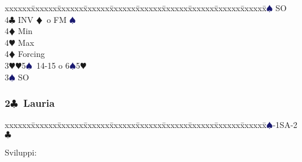 \documentclass[a4paper,italian]{article}
\newcommand{\BC}{\textcolor{OliveGreen}{$\clubsuit$}}
\newcommand{\BD}{\textcolor{RedOrange}{$\vardiamondsuit$}}
\newcommand{\BH}{\textcolor{Red2}{$\varheartsuit${}}}
\newcommand{\BS}{\textcolor{MidnightBlue}{$\spadesuit${}}}
\newcommand{\pdfc}{\texorpdfstring{\BC{}}{C}}
\newenvironment{bidtable}
{\begin{tabbing}

    xxxxxx\=xxxxxx\=xxxxxx\=xxxxxx\=xxxxxx\=xxxxxx\=xxxxxx\=xxxxxx\=xxxxxx\=xxxxxx\=\kill}
{\end{tabbing} }%
\begin{document}
\begin{multicols}{2}
\begin{bidtable}
                                            3\BS \> SO\\
                                            4\BC \> INV \BD\ o FM \BS \+\\
                                            4\BD \> Min\\
                                            4\BH \> Max\-\\
                                            4\BD \> Forcing\-\\
                                            3\BH {}\BH 5\BS\ 14-15 o 6\BS 5\BH \+\\
                                            3\BS \> SO\-\-
                                        \end{bidtable}

                                        \subsubsection{2\pdfc\ Lauria}
                                        \begin{bidtable}
                                            1\BS-1SA-2\BC
                                        \end{bidtable}

                                        Sviluppi:


\end{multicols}
\end{document}
